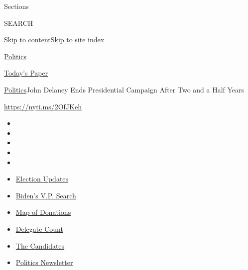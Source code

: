 Sections

SEARCH

\protect\hyperlink{site-content}{Skip to
content}\protect\hyperlink{site-index}{Skip to site index}

\href{https://www.nytimes.com/section/politics}{Politics}

\href{https://myaccount.nytimes.com/auth/login?response_type=cookie\&client_id=vi}{}

\href{https://www.nytimes.com/section/todayspaper}{Today's Paper}

\href{/section/politics}{Politics}\textbar{}John Delaney Ends
Presidential Campaign After Two and a Half Years

\url{https://nyti.ms/2OfJKeh}

\begin{itemize}
\item
\item
\item
\item
\item
\end{itemize}

\begin{itemize}
\item
  \href{https://www.nytimes.com/2020/07/31/us/elections/biden-vs-trump.html?action=click\&pgtype=Article\&state=default\&region=TOP_BANNER\&context=storylines_menu}{Election
  Updates}
\item
  \href{https://www.nytimes.com/article/biden-vice-president-2020.html?action=click\&pgtype=Article\&state=default\&region=TOP_BANNER\&context=storylines_menu}{Biden's
  V.P. Search}
\item
  \href{https://www.nytimes.com/interactive/2020/07/24/us/politics/trump-biden-campaign-donors.html?action=click\&pgtype=Article\&state=default\&region=TOP_BANNER\&context=storylines_menu}{Map
  of Donations}
\item
  \href{https://www.nytimes.com/interactive/2020/us/elections/delegate-count-primary-results.html?action=click\&pgtype=Article\&state=default\&region=TOP_BANNER\&context=storylines_menu}{Delegate
  Count}
\item
  \href{https://www.nytimes.com/interactive/2019/us/politics/2020-presidential-candidates.html?action=click\&pgtype=Article\&state=default\&region=TOP_BANNER\&context=storylines_menu}{The
  Candidates}
\item
  \href{https://www.nytimes.com/newsletters/politics?action=click\&pgtype=Article\&state=default\&region=TOP_BANNER\&context=storylines_menu}{Politics
  Newsletter}
\end{itemize}

